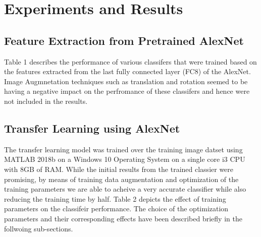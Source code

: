 \documentclass[doc/report.tex]{subfiles}
\begin{document}
\section{Experiments and Results}
\subsection{Feature Extraction from Pretrained AlexNet}
Table 1 describes the performance of various classifers that were trained based on the features extracted from the last fully connected layer (FC8) of the AlexNet. Image Augmnetation techniques such as translation and rotation seemed to be having a negative impact on the perfromance of these classifers and hence were not included in the results.

\begin{table}[]
\centering
\caption{Accuracy of various trained classifers}
\label{tab:my-table1}
\end{table}

\subsection{Transfer Learning using AlexNet}
The transfer learning model was trained over the training image datset using MATLAB 2018b on a Windows 10 Operating System on a single core i3 CPU with 8GB of RAM. While the initial results from the trained classier were promising, by means of training data augmentation and optimization of the training parameters we are able to acheive a very accurate classifier while also reducing the training time by half. Table 2 depicts the effect of training parameters on the classifeir performance. The choice of the optimization parameters and their corresponding effects have been described briefly in the follwoing sub-sections.
\end{document}
